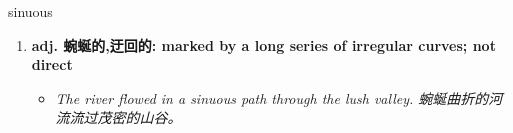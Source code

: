
\begin{frame}
{\huge sinuous}
\begin{center}
\begin{enumerate}\Large
  \item \textbf{adj. 蜿蜒的,迂回的: marked by a long series of irregular curves; not direct}
  \begin{itemize}
    \item \em{\Large{The river flowed in a sinuous path through the lush valley. 蜿蜒曲折的河流流过茂密的山谷。}}
  \end{itemize}
\end{enumerate}
\end{center}
\end{frame}
